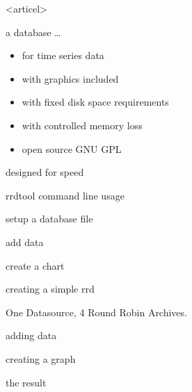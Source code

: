 \mode<articel>{\tableofcontents}

\begin{frame}{a database \ldots}
\begin{itemize}[<+-| alert@+>]
\item for time series data
\item with graphics included
\item with fixed disk space requirements
\item with controlled memory loss
\item open source GNU GPL
\end{itemize}
\end{frame}

\begin{frame}{designed for speed}
\end{frame}

\begin{frame}{rrdtool command line usage}
\begin{description}[<+-| alert@+>]
\item[rrdtool create] setup a database file
\item[rrdtool update] add data
\item[rrdtool graph] create a chart
\end{description}
\end{frame}

\begin{frame}{creating a simple rrd}

One Datasource, 4 Round Robin Archives.
\end{frame}

\begin{frame}{adding data}

\end{frame}

\begin{frame}{creating a graph}

\end{frame}

\begin{frame}{the result}
\end{frame}


